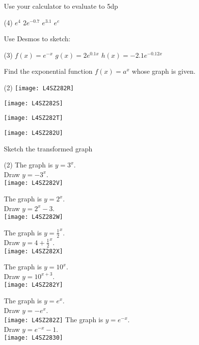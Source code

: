 \begin{Exercise}[title={$e^x$ functions},label=exExpFunctions]
	\Question Use your calculator to evaluate to 5dp 
	\begin{tasks}(4)
	\task $e^{4}$ %
\task $2 e^{ -0.7}$ %
\task $e^{3.1}$ %
\task $e^{e}$ %
	\end{tasks}

\Question Use Desmos to sketch: 
\begin{tasks}(3)
\task $f (x) =e^{ -x}$ 
\task $g (x) =2 e^{0.1 x}$ 
\task $h (x) = -2.1 e^{ -0.12 x}$
\end{tasks}

	\Question Find the exponential function $f (x) =a^{x}$ whose graph is given. 
\begin{tasks}(2)
	\texttt{[image: L4SZ282R]}
	
	\task 
	\texttt{[image: L4SZ282S]}
	
	\task 
	\texttt{[image: L4SZ282T]}
	
	\task 
	\texttt{[image: L4SZ282U]}
\end{tasks}

\Question Sketch the transformed graph
\begin{tasks}(2)
	\task The graph is $y =3^x$. \\Draw $y = -3^{x}$.\\ %
	\texttt{[image: L4SZ282V]}
	
	\task The graph is $y =2^x$. \\Draw $y =2^{x} -3$.\\%
	\texttt{[image: L4SZ282W]}
	
	\task The graph is $y =\frac{1}{2}^{x}$. \\Draw $y =4 +\frac{1}{2}^{x}$.\\%
	\texttt{[image: L4SZ282X]}
	
	\task The graph is $y =10^{x}$. \\Draw $y =10^{x +3}$.\\%
	\texttt{[image: L4SZ282Y]}
	
	\task The graph is $y =e^{x}$. \\Draw $y = -e^{x}$.\\ %
	\texttt{[image: L4SZ282Z]}
	\task The graph is $y =e^{ -x}$. \\Draw $y =e^{ -x} -1$.\\%
\texttt{[image: L4SZ2830]}
\end{tasks}
\end{Exercise}

